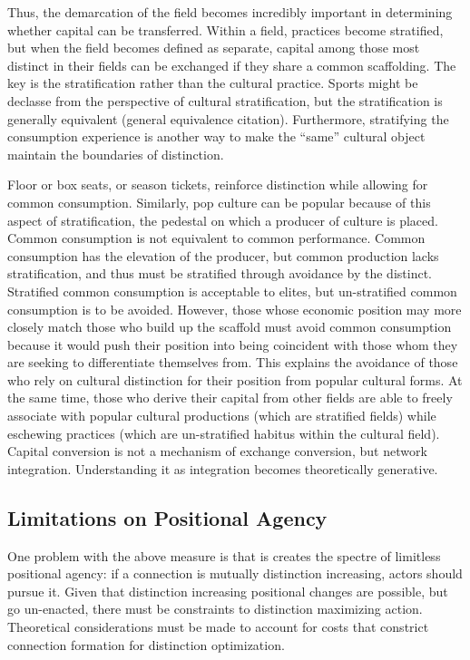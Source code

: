 \documentclass[12pt]{article}
\begin{document}
Thus, the demarcation of the field becomes incredibly important in determining whether capital can be transferred. Within a field, practices become stratified, but when the field becomes defined as separate, capital among those most distinct in their fields can be exchanged if they share a common scaffolding. The key is the stratification rather than the cultural practice. Sports might be declasse from the perspective of cultural stratification, but the stratification is generally equivalent (general equivalence citation). Furthermore, stratifying the consumption experience is another way to make the ``same'' cultural object maintain the boundaries of distinction. 

Floor or box seats, or season tickets, reinforce distinction while allowing for common consumption. Similarly, pop culture can be popular because of this aspect of stratification, the pedestal on which a producer of culture is placed. Common consumption is not equivalent to common performance. Common consumption has the elevation of the producer, but common production lacks stratification, and thus must be stratified through avoidance by the distinct. Stratified common consumption is acceptable to elites, but un-stratified common consumption is to be avoided. However, those whose economic position may more closely match those who build up the scaffold must avoid common consumption because it would push their position into being coincident with those whom they are seeking to differentiate themselves from. This explains the avoidance of those who rely on cultural distinction for their position from popular cultural forms. At the same time, those who derive their capital from other fields are able to freely associate with popular cultural productions (which are stratified fields) while eschewing practices (which are un-stratified habitus within the cultural field). Capital conversion is not a mechanism of exchange conversion, but network integration. Understanding it as integration becomes theoretically generative.     

\subsection{Limitations on Positional Agency}
One problem with the above measure is that is creates the spectre of limitless positional agency: if a connection is mutually distinction increasing, actors should pursue it. Given that distinction increasing positional changes are possible, but go un-enacted, there must be constraints to distinction maximizing action. Theoretical considerations must be made to account for costs that constrict connection formation for distinction optimization. 
\end{document}
